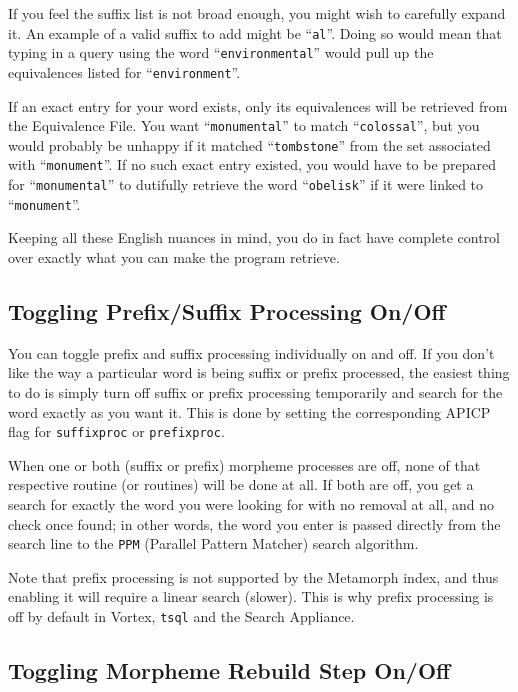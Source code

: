 If you feel the suffix list is not broad enough, you might wish to
carefully expand it.  An example of a valid suffix to add might be
``\verb`al`''.  Doing so would mean that typing in a query using the
word ``\verb`environmental`'' would pull up the equivalences listed
for ``\verb`environment`''.

If an exact entry for your word exists, only its equivalences will be
retrieved from the Equivalence File.  You want ``\verb`monumental`''
to match ``\verb`colossal`'', but you would probably be unhappy if it
matched ``\verb`tombstone`'' from the set associated with
``\verb`monument`''.  If no such exact entry existed, you would have
to be prepared for ``\verb`monumental`'' to dutifully retrieve the word
``\verb`obelisk`'' if it were linked to ``\verb`monument`''.

Keeping all these English nuances in mind, you do in fact have
complete control over exactly what you can make the program retrieve.

\subsection{Toggling Prefix/Suffix Processing On/Off}{\label{set:presuf}}

You can toggle prefix and suffix processing individually on and off.
If you don't like the way a particular word is being suffix or prefix
processed, the easiest thing to do is simply turn off suffix or prefix
processing temporarily and search for the word exactly as you want it.
This is done by setting the corresponding APICP flag for
\verb`suffixproc` or \verb`prefixproc`.

When one or both (suffix or prefix) morpheme processes are off, none
of that respective routine (or routines) will be done at all.  If both
are off, you get a search for exactly the word you were looking for
with no removal at all, and no check once found; in other words, the
word you enter is passed directly from the search line to the
\verb`PPM` (Parallel Pattern Matcher) search algorithm.

Note that prefix processing is not supported by the Metamorph index,
and thus enabling it will require a linear search (slower).  This is
why prefix processing is off by default in Vortex, \verb`tsql` and the
Search Appliance.

\subsection{Toggling Morpheme Rebuild Step On/Off}

